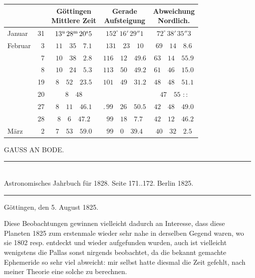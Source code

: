 \begin{center}
\begingroup\small\setlength{\tabcolsep}{4pt}
\begin{tabular}{lr|c|c|c}
\multicolumn{2}{c|}{} & \shortstack{Göttingen\\Mittlere Zeit} & \shortstack{Gerade\\Aufsteigung} & \shortstack{Abweichung\\Nordlich.} \\
\hline
Januar & 31 & $13^{\rm u}\,28^{\rm m}\,20^{\rm s}5$ & $152^{\circ}\,16'\,29''1$ & $72^{\circ}\,38'\,35''3$ \\
Februar & 3 & $11\quad35\quad7.1$ & $131\quad23\quad10$ & $69\quad14\quad8.6$ \\
 & 7 & $10\quad38\quad2.8$ & $116\quad12\quad49.6$ & $63\quad14\quad55.9$ \\
 & 8 & $10\quad24\quad5.3$ & $113\quad50\quad49.2$ & $61\quad46\quad15.0$ \\
 & 19 & $8\quad52\quad23.5$ & $101\quad49\quad31.2$ & $48\quad48\quad51.1$ \\
 & 20 & $8\quad48$ &  & $47\quad55$ \quad :\,: \\
 & 27 & $8\quad11\quad46.1$ & .\,$99\quad26\quad50.5$ & $42\quad48\quad49.0$ \\
 & 28 & $8\quad6\quad47.2$ & $99\quad18\quad7.7$ & $42\quad12\quad46.2$ \\
März & 2 & $7\quad53\quad59.0$ & $99\quad0\quad39.4$ & $40\quad32\quad2.5$ \\
\end{tabular}
\endgroup
\end{center}

\clearpage
{}

\begin{center}
{\large GAUSS AN BODE.}
\end{center}

\begin{center}
\rule{6cm}{0.4pt}\\
Astronomisches Jahrbuch für 1828. Seite 171..172. Berlin 1825.\\
\rule{6cm}{0.4pt}
\end{center}

\begin{flushright}
Göttingen, den 5. August 1825.
\end{flushright}

Diese Beobachtungen gewinnen vielleicht dadurch an Interesse, dass diese
Planeten 1825 zum erstenmale wieder sehr nahe in derselben Gegend waren, wo
sie 1802 resp. entdeckt und wieder aufgefunden wurden, auch ist vielleicht
wenigstens die Pallas sonst nirgends beobachtet, da die bekannt gemachte
Ephemeride so sehr viel abweicht: mir selbst hatte diesmal die Zeit gefehlt,
nach meiner Theorie eine solche zu berechnen.

